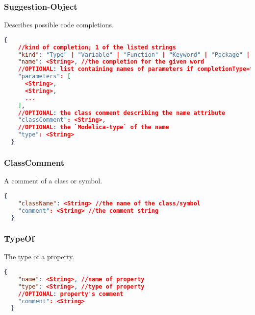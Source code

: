   \subsubsection{Suggestion-Object}
  Describes possible code completions.
  \newline{}
  \begin{lstlisting}[basicstyle=\small,language=json]
  {
    //kind of completion; 1 of the listed strings
    "kind": "Type" | "Variable" | "Function" | "Keyword" | "Package" | "Model" | "Class",
    "name": <String>, //the completion for the given word
    //OPTIONAL: list containing names of parameters if completionType=function
    "parameters": [
      <String>,
      <String>,
      ...
    ],
    //OPTIONAL: the class comment describing the name attribute
    "classComment": <String>,
    //OPTIONAL: the `Modelica-type` of the name
    "type": <String>
  }
  \end{lstlisting}

  \subsubsection{ClassComment}
  A comment of a class or symbol.
  \newline{}
  \begin{lstlisting}[basicstyle=\small,language=json]
  {
    "className": <String> //the name of the class/symbol
    "comment": <String> //the comment string
  }
  \end{lstlisting}

  \subsubsection{TypeOf}
  The type of a property.
  \newline{}
  \begin{lstlisting}[basicstyle=\small,language=json]
  {
    "name": <String>, //name of property
    "type": <String>, //type of property
    //OPTIONAL: property's comment
    "comment": <String>
  }
  \end{lstlisting}
